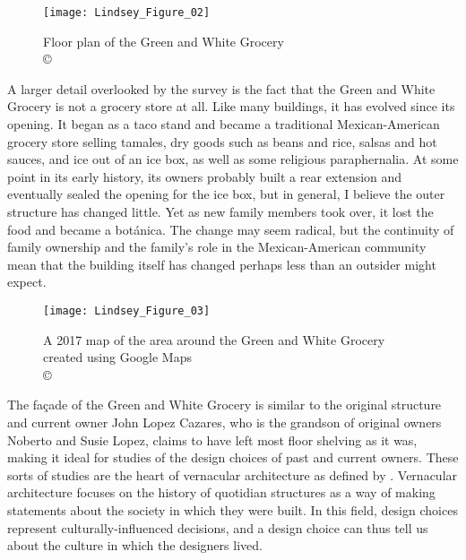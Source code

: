 \begin{figure}[!htb]
	\texttt{[image: Lindsey\_Figure\_02]}
	\caption{Floor plan of the Green and White Grocery\\
		{\normalfont\scriptsize \copyright\
			\shortauthor
	}}
	\label{fig:Lindsey_Figure_02}
\end{figure}

A larger detail overlooked by the survey is the fact that the Green and White Grocery is not a grocery store at all. Like many buildings, it has evolved since its opening. It began as a taco stand and became a traditional Mexican-American grocery store selling tamales, dry goods such as beans and rice, salsas and hot sauces, and ice out of an ice box, as well as some religious paraphernalia. At some point in its early history, its owners probably built a rear extension and eventually sealed the opening for the ice box, but in general, I believe the outer structure has changed little. Yet as new family members took over, it lost the food and became a botánica. The change may seem radical, but the continuity of family ownership and the family’s role in the Mexican-American community mean that the building itself has changed perhaps less than an outsider might expect.

\begin{figure}[!htb]
	\texttt{[image: Lindsey\_Figure\_03]}
	\caption{A 2017 map of the area around the Green and White Grocery created using Google Maps \\
		{\normalfont\scriptsize \copyright\ \textcite{googlemaps}
	}}
	\label{fig:Lindsey_Figure_03}
\end{figure}

The façade of the Green and White Grocery is similar to the original structure and current owner John Lopez Cazares, who is the grandson of original owners Noberto and Susie Lopez, claims to have left most floor shelving as it was, making it ideal for studies of the design choices of past and current owners. These sorts of studies are the heart of vernacular architecture as defined by \textcite{glassie}. Vernacular architecture focuses on the history of quotidian structures as a way of making statements about the society in which they were built. In this field, design choices represent culturally-influenced decisions, and a design choice can thus tell us about the culture in which the designers lived.

